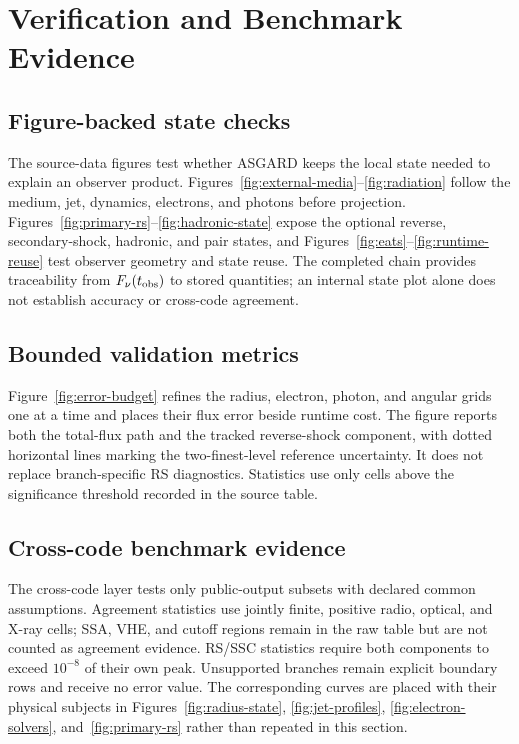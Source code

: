 \documentclass[twocolumn]{aastex702}
\begin{document}
\clearpage
\section{Verification and Benchmark Evidence} \label{sec:verification}

\subsection{Figure-backed state checks}

The source-data figures test whether ASGARD keeps the local state needed to
explain an observer product.  Figures~\ref{fig:external-media}--\ref{fig:radiation}
follow the medium, jet, dynamics, electrons, and photons before projection.
Figures~\ref{fig:primary-rs}--\ref{fig:hadronic-state} expose the optional
reverse, secondary-shock, hadronic, and pair states, and
Figures~\ref{fig:eats}--\ref{fig:runtime-reuse} test observer geometry and state
reuse.  The completed chain provides traceability from
\(F_\nu(t_{\rm obs})\) to stored quantities; an internal state plot alone does
not establish accuracy or cross-code agreement.

\subsection{Bounded validation metrics}

Figure~\ref{fig:error-budget} refines the radius, electron, photon, and angular
grids one at a time and places their flux error beside runtime cost.  The figure
reports both the total-flux path and the tracked reverse-shock component, with
dotted horizontal lines marking the two-finest-level reference uncertainty.
It does not replace branch-specific RS diagnostics.  Statistics use only cells above the significance
threshold recorded in the source table.

\subsection{Cross-code benchmark evidence}

The cross-code layer tests only public-output subsets with declared common
assumptions.  Agreement statistics use jointly finite, positive radio, optical,
and X-ray cells; SSA, VHE, and cutoff regions remain in the raw table but are not
counted as agreement evidence.  RS/SSC statistics require both components to
exceed \(10^{-8}\) of their own peak.  Unsupported branches remain explicit
boundary rows and receive no error value.  The corresponding curves are placed
with their physical subjects in Figures~\ref{fig:radius-state},
\ref{fig:jet-profiles}, \ref{fig:electron-solvers}, and~\ref{fig:primary-rs}
rather than repeated in this section.
\end{document}
